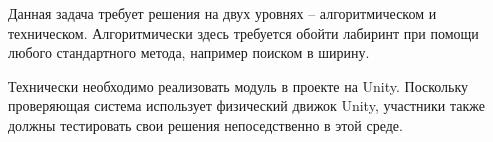 \solutionSection

Данная задача требует решения на двух уровнях -- алгоритмическом и техническом. Алгоритмически здесь требуется обойти лабиринт при помощи любого стандартного метода, например поиском в ширину.

Технически необходимо реализовать модуль в проекте на Unity. Поскольку проверяющая система использует физический движок Unity, участники также должны тестировать свои решения непоседственно в этой среде.

\codeExample

